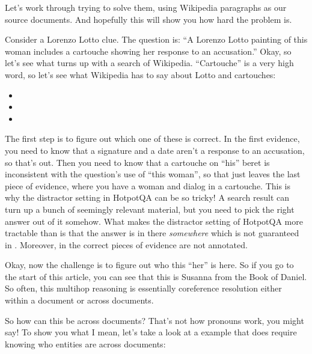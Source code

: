 Let's work through trying to solve them, using Wikipedia paragraphs as our source documents.  And hopefully this will show you how hard the problem is.

Consider a Lorenzo Lotto clue.  The question is: ``A Lorenzo Lotto painting of this woman includes a cartouche showing her response to an accusation.''  Okay, so let's see what turns up with a search of Wikipedia.  ``Cartouche'' is a very high \tfidf{} word, so let's see what Wikipedia has to say about Lotto and cartouches:
\begin{itemize}
\item {}

\item {}

\item {}

\end{itemize}

The first step is to figure out which one of these is correct.  In the first evidence, you need to know that a signature and a date aren't a response to an accusation, so that's out.  Then you need to know that a cartouche on ``his'' beret is inconsistent with the question's use of ``this woman'', so that just leaves the last piece of evidence, where you have a woman and dialog in a cartouche.  This is why the distractor setting in HotpotQA can be so tricky!  A search result can turn up a bunch of seemingly relevant material, but you need to pick the right answer out of it somehow.  What makes the distractor setting of HotpotQA more tractable than \quizbowl{} is that the answer is in there \emph{somewhere} which is not guaranteed in \quizbowl{}.  Moreover, in \quizbowl{} the correct pieces of evidence are not annotated.

Okay, now the challenge is to figure out who this ``her'' is here.  So if you go to the start of this article, you can see that this is Susanna from the Book of Daniel.  So often, this multihop reasoning is essentially coreference resolution either within a document or across documents.

So how can this be across documents?  That's not how pronouns work, you might say!  To show you what I mean, let's take a look at a \quizbowl{} example that does require knowing who entities are across documents:

